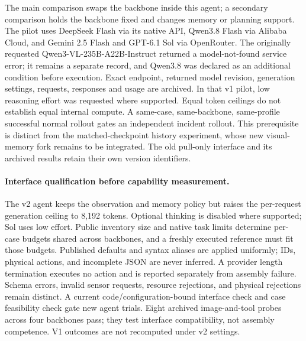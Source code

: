 \documentclass[10pt,twocolumn,letterpaper]{article}
\begin{document}
The main comparison swaps the backbone inside this agent; a secondary comparison holds the backbone fixed and changes memory or planning support. The pilot uses DeepSeek Flash via its native API, Qwen3.8 Flash via Alibaba Cloud, and Gemini 2.5 Flash and GPT-6.1 Sol via OpenRouter. The originally requested Qwen3-VL-235B-A22B-Instruct returned a model-not-found service error; it remains a separate record, and Qwen3.8 was declared as an additional condition before execution. Exact endpoint, returned model revision, generation settings, requests, responses and usage are archived. In that v1 pilot, low reasoning effort was requested where supported. Equal token ceilings do not establish equal internal compute. A same-case, same-backbone, same-profile successful normal rollout gates an independent incident rollout. This prerequisite is distinct from the matched-checkpoint history experiment, whose new visual-memory fork remains to be integrated. The old pull-only interface and its archived results retain their own version identifiers.

\paragraph{Interface qualification before capability measurement.}
The v2 agent keeps the observation and memory policy but raises the per-request generation ceiling to 8,192 tokens. Optional thinking is disabled where supported; Sol uses low effort. Public inventory size and native task limits determine per-case budgets shared across backbones, and a freshly executed reference must fit those budgets. Published defaults and syntax aliases are applied uniformly; IDs, physical actions, and incomplete JSON are never inferred. A provider length termination executes no action and is reported separately from assembly failure. Schema errors, invalid sensor requests, resource rejections, and physical rejections remain distinct. A current code/configuration-bound interface check and case feasibility check gate new agent trials. Eight archived image-and-tool probes across four backbones pass; they test interface compatibility, not assembly competence. V1 outcomes are not recomputed under v2 settings.
\end{document}
